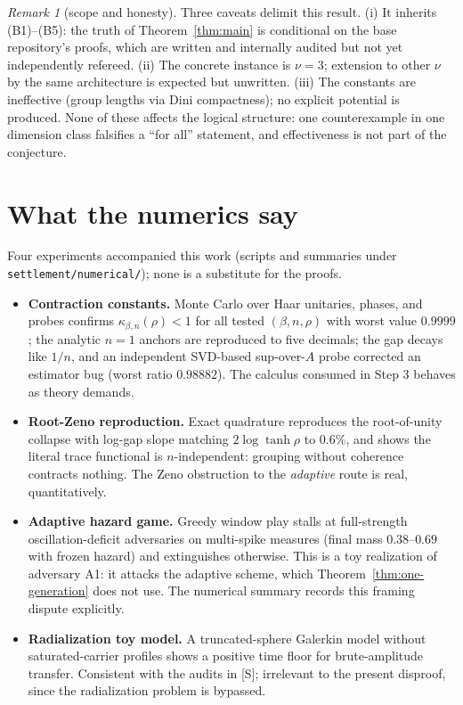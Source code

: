 \documentclass[11pt]{article}
\theoremstyle{remark}
\newtheorem{remark}[theorem]{Remark}
\theoremstyle{definition}
\begin{document}
\begin{remark}[scope and honesty]
Three caveats delimit this result.  (i) It inherits (B1)--(B5): the truth of
Theorem~\ref{thm:main} is conditional on the base repository's proofs, which
are written and internally audited but not yet independently refereed.
(ii) The concrete instance is $\nu=3$; extension to other $\nu$ by the same
architecture is expected but unwritten.  (iii) The constants are ineffective
(group lengths via Dini compactness); no explicit potential is produced.
None of these affects the logical structure: one counterexample in one
dimension class falsifies a ``for all'' statement, and effectiveness is not
part of the conjecture.
\end{remark}

\section{What the numerics say}

Four experiments accompanied this work (scripts and summaries under
\texttt{settlement/numerical/}); none is a substitute for the proofs.

\begin{itemize}
 \item \textbf{Contraction constants.}  Monte Carlo over Haar unitaries,
       phases, and probes confirms $\kappa_{\beta,n}(\rho)<1$ for all tested
       $(\beta,n,\rho)$ with worst value $0.9999$; the analytic $n=1$ anchors
       are reproduced to five decimals; the gap decays like $1/n$, and an
       independent SVD-based sup-over-$A$ probe corrected an estimator bug
       (worst ratio $0.98882$).  The calculus consumed in Step 3 behaves as
       theory demands.
 \item \textbf{Root-Zeno reproduction.}  Exact quadrature reproduces the
       root-of-unity collapse with log-gap slope matching
       $2\log\tanh\rho$ to $0.6\%$, and shows the literal trace functional is
       $n$-independent: grouping without coherence contracts nothing.  The
       Zeno obstruction to the \emph{adaptive} route is real, quantitatively.
 \item \textbf{Adaptive hazard game.}  Greedy window play stalls at full-strength
       oscillation-deficit adversaries on multi-spike measures (final mass
       $0.38$--$0.69$ with frozen hazard) and extinguishes otherwise.  This is
       a toy realization of adversary A1: it attacks the adaptive scheme,
       which Theorem~\ref{thm:one-generation} does not use.  The numerical
       summary records this framing dispute explicitly.
 \item \textbf{Radialization toy model.}  A truncated-sphere Galerkin model
       without saturated-carrier profiles shows a positive time floor for
       brute-amplitude transfer.  Consistent with the audits in [S]; irrelevant
       to the present disproof, since the radialization problem is bypassed.
\end{itemize}
\end{document}
